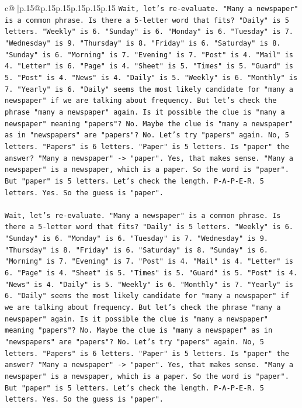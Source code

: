 \documentclass{article}
\begin{document}
{\begin{supertabular}{c@{$\;$}|p{.15\linewidth}@{}p{.15\linewidth}p{.15\linewidth}p{.15\linewidth}p{.15\linewidth}p{.15\linewidth}}
{{{\texttt{Wait, let's re{-}evaluate. "Many a newspaper" is a common phrase. Is there a 5{-}letter word that fits? "Daily" is 5 letters. "Weekly" is 6. "Sunday" is 6. "Monday" is 6. "Tuesday" is 7. "Wednesday" is 9. "Thursday" is 8. "Friday" is 6. "Saturday" is 8. "Sunday" is 6. "Morning" is 7. "Evening" is 7. "Post" is 4. "Mail" is 4. "Letter" is 6. "Page" is 4. "Sheet" is 5. "Times" is 5. "Guard" is 5. "Post" is 4. "News" is 4. "Daily" is 5. "Weekly" is 6. "Monthly" is 7. "Yearly" is 6. "Daily" seems the most likely candidate for "many a newspaper" if we are talking about frequency. But let's check the phrase "many a newspaper" again. Is it possible the clue is "many a newspaper" meaning "papers"? No. Maybe the clue is "many a newspaper" as in "newspapers" are "papers"? No. Let's try "papers" again. No, 5 letters. "Papers" is 6 letters. "Paper" is 5 letters. Is "paper" the answer? "Many a newspaper" {-}> "paper". Yes, that makes sense. "Many a newspaper" is a newspaper, which is a paper. So the word is "paper". But "paper" is 5 letters. Let's check the length. P{-}A{-}P{-}E{-}R. 5 letters. Yes. So the guess is "paper".} \\
\\ 
\texttt{Wait, let's re{-}evaluate. "Many a newspaper" is a common phrase. Is there a 5{-}letter word that fits? "Daily" is 5 letters. "Weekly" is 6. "Sunday" is 6. "Monday" is 6. "Tuesday" is 7. "Wednesday" is 9. "Thursday" is 8. "Friday" is 6. "Saturday" is 8. "Sunday" is 6. "Morning" is 7. "Evening" is 7. "Post" is 4. "Mail" is 4. "Letter" is 6. "Page" is 4. "Sheet" is 5. "Times" is 5. "Guard" is 5. "Post" is 4. "News" is 4. "Daily" is 5. "Weekly" is 6. "Monthly" is 7. "Yearly" is 6. "Daily" seems the most likely candidate for "many a newspaper" if we are talking about frequency. But let's check the phrase "many a newspaper" again. Is it possible the clue is "many a newspaper" meaning "papers"? No. Maybe the clue is "many a newspaper" as in "newspapers" are "papers"? No. Let's try "papers" again. No, 5 letters. "Papers" is 6 letters. "Paper" is 5 letters. Is "paper" the answer? "Many a newspaper" {-}> "paper". Yes, that makes sense. "Many a newspaper" is a newspaper, which is a paper. So the word is "paper". But "paper" is 5 letters. Let's check the length. P{-}A{-}P{-}E{-}R. 5 letters. Yes. So the guess is "paper".} \\
\\ 
}}}
\end{supertabular}}
\end{document}
